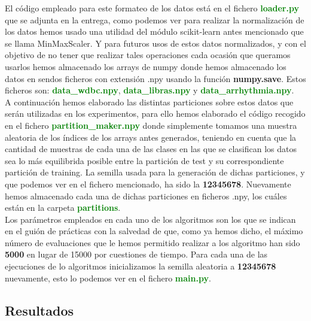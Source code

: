 \documentclass[10pt,a4paper]{article}
\begin{document}
El código empleado para este formateo de los datos está en el fichero \textbf{\textcolor{green}{loader.py}} que se adjunta en la entrega, como podemos ver para realizar la normalización de los datos hemos usado una utilidad del módulo scikit-learn antes mencionado que se llama MinMaxScaler. Y para futuros usos de estos datos normalizados, y con el objetivo de no tener que realizar tales operaciones cada ocasión que queramos usarlos hemos almacenado los arrays de numpy donde hemos almacenado los datos en sendos ficheros con extensión .npy usando la función \textbf{numpy.save}. Estos ficheros son: \textbf{\textcolor{green}{data\_wdbc.npy}}, \textbf{\textcolor{green}{data\_libras.npy}} y \textbf{\textcolor{green}{data\_arrhythmia.npy}}.\\

A continuación hemos elaborado las distintas particiones sobre estos datos que serán utilizadas en los experimentos, para ello hemos elaborado el código recogido en el fichero \textbf{\textcolor{green}{partition\_maker.npy}} donde simplemente tomamos una muestra aleatoria de los índices de los arrays antes generados, teniendo en cuenta que la cantidad de muestras de cada una de las clases en las que se clasifican los datos sea lo más equilibrida posible entre la partición de test y su correspondiente partición de training. La semilla usada para la generación de dichas particiones, y que podemos ver en el fichero mencionado, ha sido la \textbf{12345678}. Nuevamente hemos almacenado cada una de dichas particiones en ficheros .npy, los cuáles están en la carpeta \textbf{\textcolor{green}{partitions}}.\\

Los parámetros empleados en cada uno de los algoritmos son los que se indican en el guión de prácticas con la salvedad de que, como ya hemos dicho, el máximo número de evaluaciones que le hemos permitido realizar a los algoritmo han sido \textbf{5000} en lugar de 15000 por cuestiones de tiempo. Para cada una de las ejecuciones de lo algoritmos inicializamos la semilla aleatoria a \textbf{12345678} nuevamente, esto lo podemos ver en el fichero \textbf{\textcolor{green}{main.py}}.\\


\subsection{\color[rgb]{0.0,0.0,0.51}Resultados}
\end{document}
